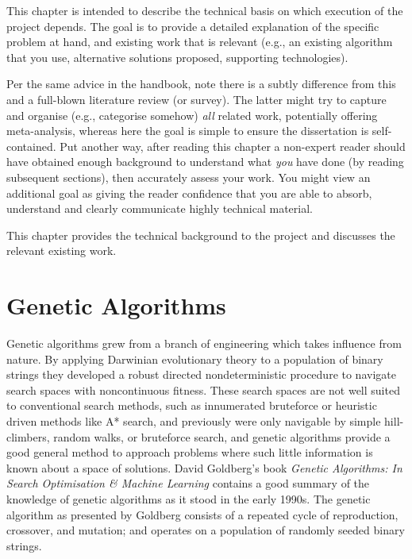 {
	\color{red}
\noindent
This chapter is intended to describe the technical basis on which execution
of the project depends.  The goal is to provide a detailed explanation of
the specific problem at hand, and existing work that is relevant (e.g., an
existing algorithm that you use, alternative solutions proposed, supporting
technologies).

Per the same advice in the handbook, note there is a subtly difference from
this and a full-blown literature review (or survey).  The latter might try
to capture and organise (e.g., categorise somehow) {\em all} related work,
potentially offering meta-analysis, whereas here the goal is simple to
ensure the dissertation is self-contained.  Put another way, after reading
this chapter a non-expert reader should have obtained enough background to
understand what {\em you} have done (by reading subsequent sections), then
accurately assess your work.  You might view an additional goal as giving
the reader confidence that you are able to absorb, understand and clearly
communicate highly technical material.
}

This chapter provides the technical background to the project and discusses
the relevant existing work.

\section{Genetic Algorithms}
Genetic algorithms grew from a branch of engineering which takes influence from
nature. By applying Darwinian evolutionary theory to a population of binary strings
they developed
a robust directed nondeterministic procedure to navigate search spaces with noncontinuous
fitness. These search spaces are not well suited to conventional search methods,
such as innumerated bruteforce or heuristic driven methods like A* search,
and previously were only navigable by simple hill-climbers, random walks, or bruteforce search,
and genetic algorithms provide a good general method to approach problems where
such little information is known about a space of solutions.
David Goldberg's book {\em Genetic Algorithms: In Search Optimisation \& Machine
Learning} \cite{Goldberg:1989:GAS:534133} contains a good summary of the knowledge
of genetic algorithms as it stood in the early 1990s.
The genetic algorithm as presented by Goldberg consists
of a repeated cycle of reproduction, crossover, and mutation; and operates on a
population of randomly seeded binary strings.

